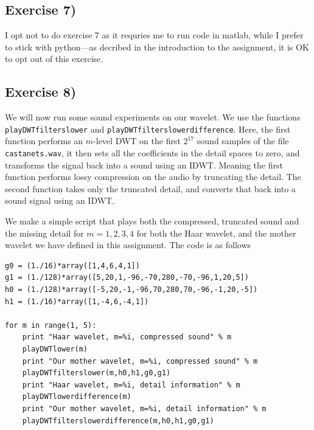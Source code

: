 \documentclass[a4paper, 11pt, notitlepage, english]{article}
\begin{document}
\clearpage

\subsection*{Exercise 7)}
I opt not to do exercise 7 as it requries me to run code in matlab, while I prefer to stick with python---as decribed in the introduction to the assignment, it is OK to opt out of this exercise.

\subsection*{Exercise 8)}
We will now run some sound experiments on our wavelet. We use the functions \texttt{playDWTfilterslower} and \texttt{playDWTfilterslowerdifference}. Here, the first function performs an $m$-level DWT on the first $2^{17}$ sound samples of the file \verb+castanets.wav+, it then sets all the coefficients in the detail spaces to zero, and transforms the signal back into a sound using an IDWT. Meaning the first function performs lossy compression on the audio by truncating the detail. The second function takes only the truncated detail, and converts that back into a sound signal using an IDWT.

We make a simple script that plays both the compressed, truncated sound and the missing detail for $m=1,2,3,4$ for both the Haar wavelet, and the mother wavelet we have defined in this assignment. The code is as follows

\begin{lstlisting}
g0 = (1./16)*array([1,4,6,4,1])
g1 = (1./128)*array([5,20,1,-96,-70,280,-70,-96,1,20,5])
h0 = (1./128)*array([-5,20,-1,-96,70,280,70,-96,-1,20,-5])
h1 = (1./16)*array([1,-4,6,-4,1])

for m in range(1, 5):
    print "Haar wavelet, m=%i, compressed sound" % m
    playDWTlower(m)
    print "Our mother wavelet, m=%i, compressed sound" % m
    playDWTfilterslower(m,h0,h1,g0,g1)
    print "Haar wavelet, m=%i, detail information" % m
    playDWTlowerdifference(m)
    print "Our mother wavelet, m=%i, detail information" % m
    playDWTfilterslowerdifference(m,h0,h1,g0,g1)
\end{lstlisting}
\end{document}
